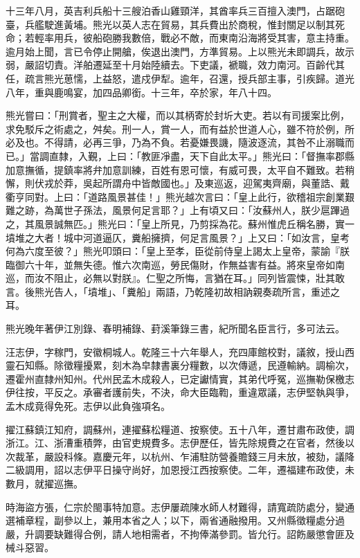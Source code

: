 \begin{pinyinscope}
十三年八月，英吉利兵船十三艘泊香山雞頸洋，其酋率兵三百擅入澳門，占踞砲臺，兵艦駛進黃埔。熊光以英人志在貿易，其兵費出於商稅，惟封關足以制其死命；若輕率用兵，彼船砲勝我數倍，戰必不敵，而東南沿海將受其害，意主持重。逾月始上聞，言已令停止開艙，俟退出澳門，方準貿易。上以熊光未即調兵，故示弱，嚴詔切責。洋舶遷延至十月始陸續去。下吏議，褫職，效力南河。百齡代其任，疏言熊光葸懦，上益怒，遣戍伊犁。逾年，召還，授兵部主事，引疾歸。道光八年，重與鹿鳴宴，加四品卿銜。十三年，卒於家，年八十四。

熊光嘗曰：「刑賞者，聖主之大權，而以其柄寄於封圻大吏。若以有司援案比例，求免駁斥之術處之，舛矣。刑一人，賞一人，而有益於世道人心，雖不符於例，所必及也。不得請，必再三爭，乃為不負。若憂嫌畏譏，隨波逐流，其咎不止溺職而已。」當調直隸，入覲，上曰：「教匪凈盡，天下自此太平。」熊光曰：「督撫率郡縣加意撫循，提鎮率將弁加意訓練，百姓有恩可懷，有威可畏，太平自不難致。若稍懈，則伏戎於莽，吳起所謂舟中皆敵國也。」及東巡返，迎駕夷齊廟，與董誥、戴衢亨同對。上曰：「道路風景甚佳！」熊光越次言曰：「皇上此行，欲稽祖宗創業艱難之跡，為萬世子孫法，風景何足言耶？」上有頃又曰：「汝蘇州人，朕少扈蹕過之，其風景誠無匹。」熊光曰：「皇上所見，乃剪採為花。蘇州惟虎丘稱名勝，實一墳堆之大者！城中河道逼仄，糞船擁擠，何足言風景？」上又曰：「如汝言，皇考何為六度至彼？」熊光叩頭曰：「皇上至孝，臣從前侍皇上謁太上皇帝，蒙諭『朕臨御六十年，並無失德。惟六次南巡，勞民傷財，作無益害有益。將來皇帝如南巡，而汝不阻止，必無以對朕』。仁聖之所悔，言猶在耳。」同列皆震悚，壯其敢言。後熊光告人，「墳堆」、「糞船」兩語，乃乾隆初故相訥親奏疏所言，重述之耳。

熊光晚年著伊江別錄、春明補錄、葑溪筆錄三書，紀所聞名臣言行，多可法云。

汪志伊，字稼門，安徽桐城人。乾隆三十六年舉人，充四庫館校對，議敘，授山西靈石知縣。除徵糧擾累，刻木為皁隸書裏分糧數，以次傳遞，民遵輸納。調榆次，遷霍州直隸州知州。代州民孟木成殺人，已定讞情實，其弟代呼冤，巡撫勒保檄志伊往按，平反之。承審者護前失，不決，命大臣臨鞫，重違眾議，志伊堅執與爭，孟木成竟得免死。志伊以此負強項名。

擢江蘇鎮江知府，調蘇州，連擢蘇松糧道、按察使。五十八年，遷甘肅布政使，調浙江。江、浙漕重積弊，由官吏規費多。志伊歷任，皆先除規費之在官者，然後以次裁革，嚴設科條。嘉慶元年，以杭州、乍浦駐防營養贍錢三月未放，被劾，議降二級調用，詔以志伊平日操守尚好，加恩授江西按察使。二年，遷福建布政使，未數月，就擢巡撫。

時海盜方張，仁宗於閩事特加意。志伊屢疏陳水師人材難得，請寬疏防處分，變通選補章程，副參以上，兼用本省之人；以下，兩省通融撥用。又州縣徵糧處分過嚴，升調要缺難得合例，請人地相需者，不拘俸滿參罰。皆允行。詔飭嚴懲會匪及械斗惡習。


\end{pinyinscope}

